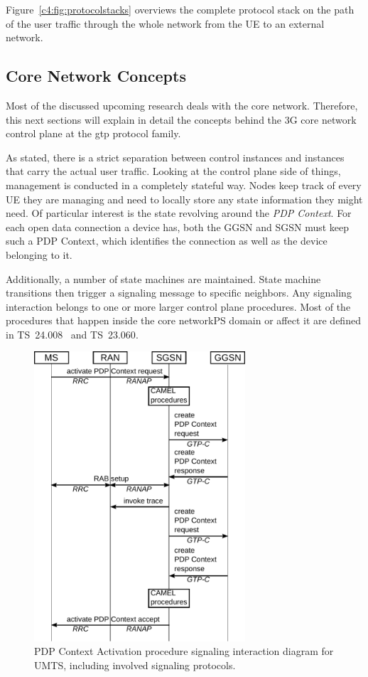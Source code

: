 Figure~\ref{c4:fig:protocolstacks} overviews the complete protocol stack on the path of the user traffic through the whole network from the \gls{UE} to an external network.


\subsection{Core Network Concepts}

Most of the discussed upcoming research deals with the core network. Therefore, this next sections will explain in detail the concepts behind the \gls{3G} core network control plane at the \gls{gtp} protocol family.

As stated, there is a strict separation between control instances and instances that carry the actual user traffic. Looking at the control plane side of things, management is conducted in a completely stateful way. Nodes keep track of every \gls{UE} they are managing and need to locally store any state information they might need. Of particular interest is the state revolving around the \textit{\gls{PDP} Context}. For each open data connection a device has, both the \gls{GGSN} and \gls{SGSN} must keep such a \gls{PDP} Context, which identifies the connection as well as the device belonging to it.

Additionally, a number of state machines are maintained. State machine transitions then trigger a signaling message to specific neighbors. Any signaling interaction belongs to one or more larger control plane procedures. Most of the procedures that happen inside the core network\gls{PS} domain or affect it are defined in \gls{TS}~24.008~\cite{3gpp.24.008} and \gls{TS}~23.060\cite{3gpp.23.060}.

\begin{figure}[htbp]
	\centering
	\includegraphics[width=0.7\textwidth]{images/pdp-context-activation-procedure.pdf}
	\caption{PDP Context Activation procedure signaling interaction diagram for \gls{UMTS}, including involved signaling protocols.}
	\label{c4:fig:pdpcontextactivationinteraction}
\end{figure}

